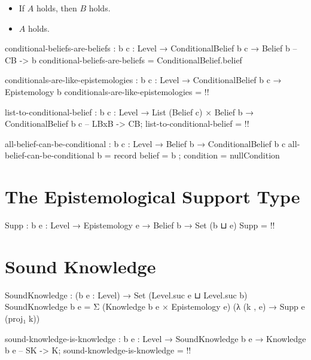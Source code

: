 \documentclass{article}
\begin{document}
\begin{itemize}
  \item If \(A\) holds, then \(B\) holds.
  \item \(A\) holds.
\end{itemize}

\begin{code}
conditional-beliefs-are-beliefs :
  {b c : Level} → ConditionalBelief b c → Belief b -- CB -> b
conditional-beliefs-are-beliefs = ConditionalBelief.belief
\end{code}

\begin{code}
conditionals-are-like-epistemologies :
  {b c : Level} → ConditionalBelief b c → Epistemology b
conditionals-are-like-epistemologies = {!!}
\end{code}

\begin{code}
list-to-conditional-belief :
  {b c : Level} →
  List (Belief c) × Belief b →
  ConditionalBelief b c -- LBxB -> CB;
list-to-conditional-belief = {!!}
\end{code}

\begin{code}
all-belief-can-be-conditional : {b c : Level} → Belief b → ConditionalBelief b c
all-belief-can-be-conditional b = record
  { belief = b
  ; condition = nullCondition
  }
\end{code}

\section{The Epistemological Support Type}

\begin{code}
Supp : {b e : Level} → Epistemology e → Belief b → Set (b ⊔ e)
Supp = {!!}
\end{code}

\section{Sound Knowledge}

\begin{code}
SoundKnowledge : (b e : Level) → Set (Level.suc e ⊔ Level.suc b)
SoundKnowledge b e =
  Σ (Knowledge b e × Epistemology e)
    (λ (k , e) → Supp e (proj₁ k))
\end{code}

\begin{code}
sound-knowledge-is-knowledge :
  {b e : Level} → SoundKnowledge b e → Knowledge b e -- SK -> K;
sound-knowledge-is-knowledge = {!!}
\end{code}
\end{document}
